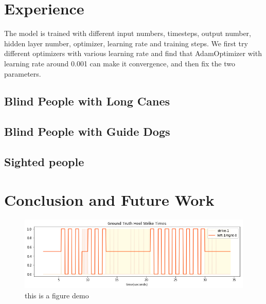 \documentclass[11pt]{article}
\begin{document}
\section{Experience}
The model is trained with different input numbers, timesteps, output number, hidden layer number, optimizer, learning rate and training steps. We first try different optimizers with various learning rate and find that AdamOptimizer with learning rate around 0.001 can make it convergence, and then fix the two parameters.

\subsection{Blind People with Long Canes}





\subsection{Blind People with Guide Dogs}





\subsection{Sighted people}






\section{Conclusion and Future Work}







\begin{figure}[ht]
\centering
\includegraphics[scale=0.6]{ground_truth_3.png}
\caption{this is a figure demo}
\label{fig:pathdemo4}
\end{figure}
\end{document}
